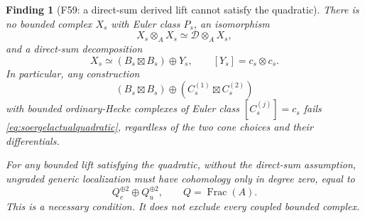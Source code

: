 \documentclass[11pt,a4paper]{article}
\newcommand{\mathscr}{\mathcal}
\newcommand{\fid}[1]{\textsf{#1}}\newcommand{\gate}[1]{\textsf{#1}}
\theoremstyle{named}\newtheorem{finding}{Finding}[section]
\theoremstyle{definition}\newtheorem{definition}[finding]{Definition}
\theoremstyle{remark}\newtheorem{remark}[finding]{Remark}
\begin{document}
\begin{finding}[\fid{F59}: a direct-sum derived lift cannot satisfy the quadratic]
\label{f:soergelderivedquadratic}
There is no bounded complex \(X_s\) with Euler class \(P_s\),
an isomorphism
\begin{equation}\label{eq:soergelactualquadratic}
 X_s\otimes_A X_s\simeq\mathscr D\otimes_A X_s,
\end{equation}
and a direct-sum decomposition
\begin{equation}\label{eq:soergelsplithypothesis}
 X_s\simeq(B_s\boxtimes B_s)\oplus Y_s,
 \qquad [Y_s]=c_s\otimes c_s.
\end{equation}
In particular, any construction
\[
 (B_s\boxtimes B_s)\oplus
 (C_s^{(1)}\boxtimes C_s^{(2)})
\]
with bounded ordinary-Hecke complexes of Euler class
\([C_s^{(j)}]=c_s\) fails
\eqref{eq:soergelactualquadratic}, regardless of the two cone
choices and their differentials.

For any bounded lift satisfying the quadratic, without the
direct-sum assumption, ungraded generic localization must have
cohomology only in degree zero, equal to
\[
                    Q_e^{\oplus2}\oplus Q_u^{\oplus2},
 \qquad Q=\operatorname{Frac}(A).
\]
This is a necessary condition. It does not exclude every
coupled bounded complex.
\end{finding}
\end{document}
